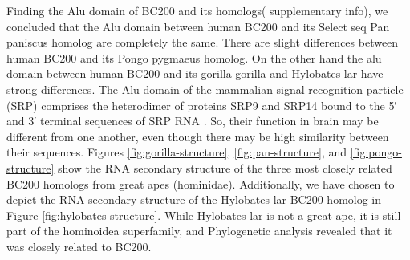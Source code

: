 \documentclass[conference, 11pt]{IEEEtran}
\begin{document}
Finding the Alu domain of BC200 and its homologs( supplementary info), we concluded that the Alu domain between human BC200 and its Select seq Pan paniscus homolog are completely the same. There are slight differences between human BC200 and its Pongo pygmaeus homolog. On the other hand the alu domain between human BC200 and its gorilla gorilla and Hylobates lar have strong differences.
The Alu domain of the mammalian signal recognition particle (SRP) comprises the heterodimer of proteins SRP9 and SRP14 bound to the 5′ and 3′ terminal sequences of SRP RNA \cite{weichenrieder2000structure}. 
So, their function in brain may be different from one another, even though there may be high similarity between their sequences. 
Figures \ref{fig:gorilla-structure}, \ref{fig:pan-structure}, and \ref{fig:pongo-structure} show the RNA secondary structure of the three most closely related BC200 homologs from great apes (hominidae). 
Additionally, we have chosen to depict the RNA secondary structure of the Hylobates lar BC200 homolog in Figure \ref{fig:hylobates-structure}. 
While Hylobates lar is not a great ape, it is still part of the hominoidea superfamily, and Phylogenetic analysis revealed that it was closely related to BC200.
\end{document}
